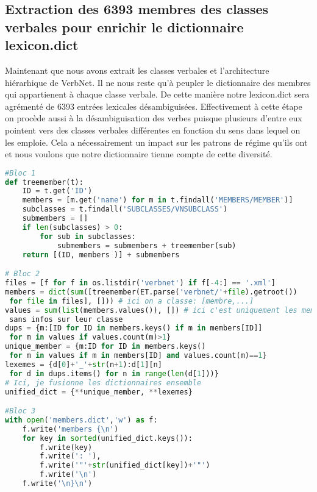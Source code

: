 \subsection{Extraction des 6393 membres des classes verbales pour enrichir le dictionnaire lexicon.dict} \label{extracmembre}

Maintenant que nous avons extrait les classes verbales et l'architecture hiérarhique de VerbNet. Il ne nous reste qu'à peupler le dictionnaire des membres qui appartienent à chaque classe verbale. De cette manière notre lexicon.dict sera agrémenté de 6393 entrées lexicales désambiguisées. Effectivement à cette étape on procède aussi à la désambiguisation des verbes puisque plusieurs d'entre eux pointent vers des classes verbales différentes en fonction du sens dans lequel on les emploie. Cela a nécessairement un impact sur les patrons de régime qu'ils ont et nous voulons que notre dictionnaire tienne compte de cette diversité.

\begin{lstlisting}[language=Python, caption = Code pour ajouter des lexèmes à lexicon.dict, label=scriptmember]
#Bloc 1
def treemember(t):
    ID = t.get('ID')
    members = [m.get('name') for m in t.findall('MEMBERS/MEMBER')]
    subclasses = t.findall('SUBCLASSES/VNSUBCLASS')
    submembers = []
    if len(subclasses) > 0:
        for sub in subclasses:
            submembers = submembers + treemember(sub)
    return [(ID, members )] + submembers

# Bloc 2
files = [f for f in os.listdir('verbnet') if f[-4:] == '.xml']
members = dict(sum([treemember(ET.parse('verbnet/'+file).getroot())
 for file in files], [])) # ici on a classe: [membre,...]
values = sum(list(members.values()), []) # ici c'est uniquement les membres
 sans infos sur leur classe
dups = {m:[ID for ID in members.keys() if m in members[ID]]
 for m in values if values.count(m)>1}
unique_member = {m:ID for ID in members.keys()
 for m in values if m in members[ID] and values.count(m)==1}
lexemes = {d[0]+'_'+str(n+1):d[1][n]
 for d in dups.items() for n in range(len(d[1]))}
# Ici, je fusionne les dictionnaires ensemble
unified_dict = {**unique_member, **lexemes}

#Bloc 3
with open('members.dict','w') as f:
    f.write('members {\n')
    for key in sorted(unified_dict.keys()):
        f.write(key)
        f.write(': '),
        f.write('"'+str(unified_dict[key])+'"')
        f.write('\n')
    f.write('\n}\n')

\end{lstlisting}

